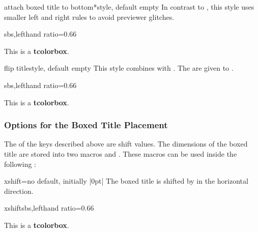 \begin{docTcbKey}[][doc new=2016-02-26]{attach boxed title to bottom*}{}{style, default empty}
  In contrast to , this style
  uses smaller left and right rules to avoid previewer glitches.
\begin{dispExample*}{sbs,lefthand ratio=0.66}
\begin{tcolorbox}[enhanced,title=My title,
  attach boxed title to bottom*]
  This is a \textbf{tcolorbox}.
\end{tcolorbox}
\end{dispExample*}
\end{docTcbKey}

\begin{docTcbKey}[][doc new=2016-02-26]{flip title}{}{style, default empty}
  This style combines 
  with . The  are given to
  .
\begin{dispExample*}{sbs,lefthand ratio=0.66}
\begin{tcolorbox}[tile,flip title={sharp corners},
  title=My title,colback=red!10,
  colbacktitle=red!75!black]
  This is a \textbf{tcolorbox}.
\end{tcolorbox}
\end{dispExample*}
\end{docTcbKey}

\clearpage

\subsubsection{Options for the Boxed Title Placement}
The  of the keys described above are shift values.
The dimensions of the boxed title are stored into two macros
 and
. These macros can be used inside the
following :

\begin{boxTcbKey}{xshift}{=}{no default, initially |0pt|}
The boxed title is shifted by  in the horizontal direction.
\begin{exdispExample*}{xshift}{sbs,lefthand ratio=0.66}
\begin{tcolorbox}[enhanced,title=My title,
  attach boxed title to top left={xshift=-2mm},
  boxed title style={size=small,colback=blue}]
  This is a \textbf{tcolorbox}.
\end{tcolorbox}
\end{exdispExample*}
\end{boxTcbKey}

